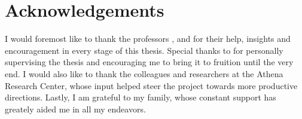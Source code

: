 %
\chapter*{Acknowledgements}
\label{sec:acknowledgements}
\vspace*{-10mm}

I would foremost like to thank the professors \thesisSupervisor, \thesisReviewerOne and \thesisReviewerTwo for their help, insights and encouragement in every stage of this thesis. Special thanks to \thesisSupervisorTitle \thesisSupervisor for personally supervising the thesis and encouraging me to bring it to fruition until the very end. I would also like to thank the colleagues and researchers at the Athena Research Center, whose input helped steer the project towards more productive directions. Lastly, I am grateful to my family, whose constant support has greately aided me in all my endeavors. 